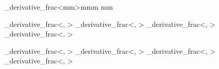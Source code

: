 

\DeclarePairedDelimiterX{} %
\DeclareMathOperator{\sign}{sign}   %
\DeclareMathOperator{\supp}{supp}   %

\ExplSyntaxOn
\NewTemplateCommand\tmpl_derivative_frac<mm>{mmm mm}{
}

\TemplateInstancePIE\od\tmpl_derivative_frac<\dif, \frac>
\TemplateInstancePIE\lod\tmpl_derivative_frac<\dif, \sfrac>
\TemplateInstancePIE\tod\tmpl_derivative_frac<\dif, \tfrac>
\TemplateInstancePIE\dod\tmpl_derivative_frac<\dif, \dfrac>

\TemplateInstancePIE\pd\tmpl_derivative_frac<\partial, \frac>
\TemplateInstancePIE\lpd\tmpl_derivative_frac<\partial, \sfrac>
\TemplateInstancePIE\tpd\tmpl_derivative_frac<\partial, \tfrac>
\TemplateInstancePIE\dpd\tmpl_derivative_frac<\partial, \dfrac>
\ExplSyntaxOff


\let\div\relax
\DeclareMathOperator{\grad}{grad}
\DeclareMathOperator{\rot}{rot}
\DeclareMathOperator{\div}{div}

